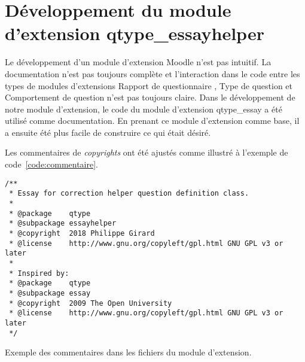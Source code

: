\chapter{Développement du module d'extension \og qtype\_essayhelper \fg{} }


Le développement d'un module d'extension Moodle n'est pas intuitif.
La documentation n'est pas toujours complète et l'interaction dans le code entre les types de modules d'extensions \og Rapport de questionnaire \fg{}, \og Type de question \fg{} et \og Comportement de question \fg{} n'est pas toujours claire.
Dans le développement de notre module d'extension, le code du module d'extension \og qtype\_essay \fg{} a été utilisé comme documentation.
En prenant ce module d'extension comme base, il a ensuite été plus facile de construire ce qui était désiré.

Les commentaires de \emph{copyrights} ont été ajustés comme illustré à l'exemple de code~\ref{code:commentaire}.

\begin{lstfloat}
\begin{lstlisting}[frame=l]
/**
 * Essay for correction helper question definition class.
 *
 * @package    qtype
 * @subpackage essayhelper
 * @copyright  2018 Philippe Girard
 * @license    http://www.gnu.org/copyleft/gpl.html GNU GPL v3 or later
 *
 * Inspired by:
 * @package    qtype
 * @subpackage essay
 * @copyright  2009 The Open University
 * @license    http://www.gnu.org/copyleft/gpl.html GNU GPL v3 or later
 */
\end{lstlisting}
\caption{Exemple des commentaires dans les fichiers du module d'extension.}
\label{code:commentaire}
\end{lstfloat}


